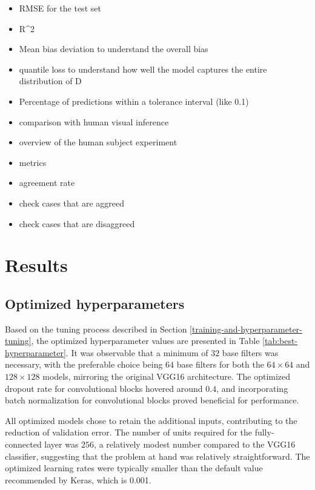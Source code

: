 \documentclass[]{interact}
\theoremstyle{plain}%
\theoremstyle{definition}
\theoremstyle{remark}
\begin{document}
\begin{itemize}
\item
  RMSE for the test set
\item
  R\^{}2
\item
  Mean bias deviation to understand the overall bias
\item
  quantile loss to understand how well the model captures the entire
  distribution of D
\item
  Percentage of predictions within a tolerance interval (like 0.1)
\item
  comparison with human visual inference
\item
  overview of the human subject experiment
\item
  metrics
\item
  agreement rate
\item
  check cases that are aggreed
\item
  check cases that are disaggreed
\end{itemize}

\hypertarget{results}{%
\section{Results}\label{results}}

\hypertarget{optimized-hyperparameters}{%
\subsection{Optimized hyperparameters}\label{optimized-hyperparameters}}

Based on the tuning process described in Section
\ref{training-and-hyperparameter-tuning}, the optimized hyperparameter
values are presented in Table \ref{tab:best-hyperparameter}. It was
observable that a minimum of \(32\) base filters was necessary, with the
preferable choice being \(64\) base filters for both the
\(64 \times 64\) and \(128 \times 128\) models, mirroring the original
VGG16 architecture. The optimized dropout rate for convolutional blocks
hovered around \(0.4\), and incorporating batch normalization for
convolutional blocks proved beneficial for performance.

All optimized models chose to retain the additional inputs, contributing
to the reduction of validation error. The number of units required for
the fully-connected layer was \(256\), a relatively modest number
compared to the VGG16 classifier, suggesting that the problem at hand
was relatively straightforward. The optimized learning rates were
typically smaller than the default value recommended by Keras, which is
0.001.
\end{document}
